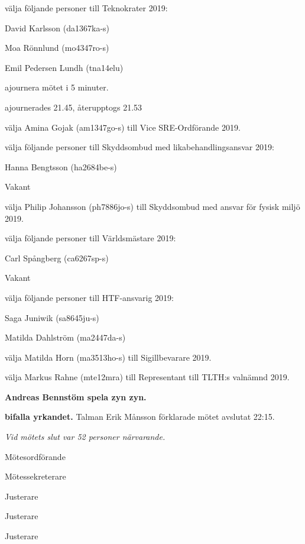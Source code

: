 \documentclass[10pt]{article}
\def\mo{Erik Månsson}
\def\ms{Axel Voss}
\def\ji{Rasmus Sobel}
\def\jii{Niklas Gustafson}
\def\jiii{Henrik Ramström}
\begin{document}
\begin{paragrafer}
\begin{paralist}
    \Mba välja följande personer till Teknokrater 2019:
    \begin{tightdashlist}
        \item David Karlsson (da1367ka-s)
        \item Moa Rönnlund (mo4347ro-s)
        \item Emil Pedersen Lundh (tna14elu)
    \end{tightdashlist}

    \Mba ajournera mötet i 5 minuter. 

    \Mba ajournerades 21.45, återupptogs 21.53
    
    \Mba välja Amina Gojak (am1347go-s) till Vice SRE-Ordförande 2019.

    \Mba välja följande personer till Skyddsombud med likabehandlingsansvar 2019:
    \begin{tightdashlist}
        \item Hanna Bengtsson (ha2684be-s)
        \item Vakant
    \end{tightdashlist}

    \Mba välja Philip Johansson (ph7886jo-s) till Skyddsombud med ansvar för fysisk miljö 2019.

    \Mba välja följande personer till Världsmästare 2019:
    \begin{tightdashlist}
        \item Carl Spångberg (ca6267sp-s)
        \item Vakant
    \end{tightdashlist}
\newpage
    \Mba välja följande personer till HTF-ansvarig 2019:
    \begin{tightdashlist}
        \item Saga Juniwik (sa8645ju-s)
        \item Matilda Dahlström (ma2447da-s)
    \end{tightdashlist}

    \Mba välja Matilda Horn (ma3513ho-s) till Sigillbevarare 2019.
    

    \Mba välja Markus Rahne (mte12mra) till Representant till TLTH:s valnämnd 2019.

\end{paralist}

\textbf{Andreas Bennstöm \ypa spela zyn zyn.}

\textbf{\Mba bifalla yrkandet.}
Talman {\mo} förklarade mötet avslutat 22:15.

\emph{Vid mötets slut var 52 personer närvarande.}

\end{paragrafer}

\newpage
\hidesignfoot
\begin{signatures}{5}
\signature{\mo}{Mötesordförande}
\signature{\ms}{Mötessekreterare}
\signature{\ji}{Justerare}
\signature{\jii}{Justerare}
\signature{\jiii}{Justerare}
\end{signatures}
\end{document}
